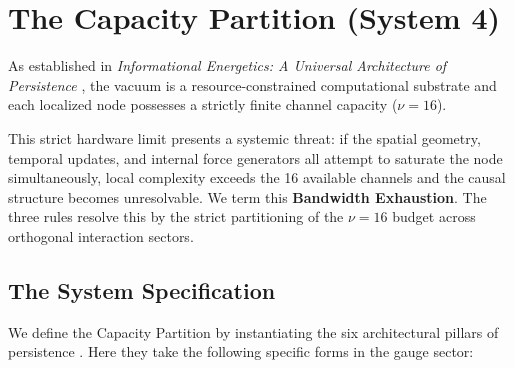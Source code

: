 \section{The Capacity Partition (System 4)}
\label{sec:capacity_partition}

As established in \textit{Informational Energetics: A Universal Architecture of Persistence} \cite{meyer_informational_2026}, the vacuum is a resource-constrained computational substrate and each localized node possesses a strictly finite channel capacity ($\nu = 16$). 

This strict hardware limit presents a systemic threat: if the spatial geometry, temporal updates, and internal force generators all attempt to saturate the node simultaneously, local complexity exceeds the 16 available channels and the causal 
structure becomes unresolvable. We term this \textbf{Bandwidth Exhaustion}. The three rules resolve this by the strict partitioning of the $\nu = 16$ budget across orthogonal interaction sectors.

\subsection{The System Specification}

We define the Capacity Partition by instantiating the six architectural pillars of persistence \cite{meyer_informational_2026}. Here they take the following specific forms in the gauge sector:

